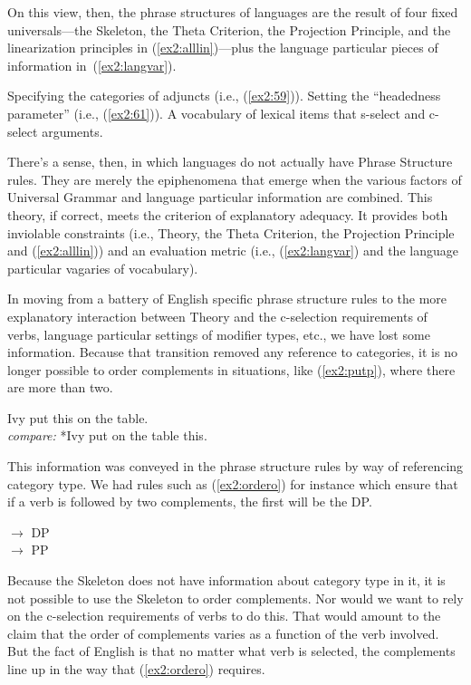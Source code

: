On this view, then, the phrase structures of languages are the result of four fixed universals---the  Skeleton, the Theta Criterion, the Projection Principle, and the linearization principles in (\ref{ex2:alllin})---plus the language particular pieces of information in~(\ref{ex2:langvar}).%
\begin{exe}
\ex \label{ex2:langvar} 
\begin{xlist}
	\ex Specifying the categories of adjuncts (i.e., (\ref{ex2:59})).
	\ex Setting the ``headedness parameter'' (i.e., (\ref{ex2:61})).
	\ex A vocabulary of lexical items that s-select and c-select arguments.
\end{xlist}
\end{exe}
There's a sense, then, in which languages do not actually have Phrase Structure rules. They are merely the epiphenomena that emerge when the various factors of Universal Grammar and language particular information are combined. This theory, if correct, meets the criterion of explanatory adequacy. It provides both inviolable constraints (i.e.,  Theory, the Theta Criterion, the Projection Principle and (\ref{ex2:alllin})) and an evaluation metric (i.e., (\ref{ex2:langvar}) and the language particular vagaries of vocabulary).

In moving from a battery of English specific phrase structure rules to the  more explanatory interaction between  Theory and the \mbox{c-selection} requirements of verbs, language particular settings of modifier types, etc., we have lost some information. Because that transition removed any reference to categories, it is no longer possible to order complements in situations, like (\ref{ex2:putp}), where there are more than two. 
\begin{exe}
\ex \label{ex2:putp} Ivy put this on the table.\\
					\emph{compare:} *Ivy put on the table this.
\end{exe}
This information was conveyed in the phrase structure rules by way of referencing category type. We had rules such as (\ref{ex2:ordero}) for instance which ensure that if a verb is followed by two complements, the first will be the DP.
\begin{exe}
\ex \label{ex2:ordero}  $\rightarrow$  DP\\  $\rightarrow$  PP
\end{exe}
Because the  Skeleton does not have information about category type in it, it is not possible to use the  Skeleton to order complements. Nor would we want to rely on the \mbox{c-selection} requirements of verbs to do this. That would amount to the claim that the order of complements varies as a function of the verb involved. But the fact of English is that no matter what verb is selected, the complements line up in the way that (\ref{ex2:ordero}) requires.

